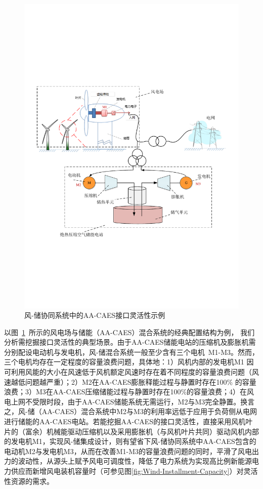 \begin{figure}[htp] %
  \centering
  \includegraphics[scale=0.75]{figures/Chap1-5-AA-CAES-Stru-Flex.pdf}
  \caption{风-储协同系统中的AA-CAES接口灵活性示例}
  \label{fig:AA-CAES-Stru-Felixibity}
\end{figure}

以图~\ref{fig:AA-CAES-Stru-Felixibity}~所示的风电场与储能（AA-CAES）混合系统的经典配置结构为例， 我们分析需挖掘接口灵活性的典型场景。由于AA-CAES储能电站的压缩机及膨胀机需分别配设电动机与发电机，风-储混合系统一般至少含有三个电机~M1-M3。然而，三个电机均存在一定程度的容量浪费问题，具体地：1）风机内部的发电机M1 因可利用风能的大小在风速低于风机额定风速时存在着不同程度的容量浪费问题（风速越低问题越严重）；2）M2在AA-CAES膨胀释能过程与静置时存在100$\%$ 的容量浪费；3）M3在AA-CAES压缩储能过程与静置时存在100$\%$的容量浪费；4）在风电上网不受限时段，由于AA-CAES储能系统无需运行，M2与M3完全静置。换言之，风-储（AA-CAES）混合系统中M2与M3的利用率远低于应用于负荷侧从电网进行储能的AA-CAES电站。若能挖掘AA-CAES的接口灵活性，直接采用风机叶片的（富余）机械能驱动压缩机以及采用膨胀机（与风机叶片共同）驱动风机内部的发电机M1，实现风-储集成设计，则有望省下风-储协同系统中AA-CAES包含的电动机M2与发电机M3，从而在改善M1-M3的容量浪费问题的同时，平滑了风电出力的波动性，从源头上赋予风电可调度性，降低了电力系统为实现高比例新能源电力供应而新增风电装机容量时（可参见图\ref{fig:Wind-Installment-Capacity}）对灵活性资源的需求。

